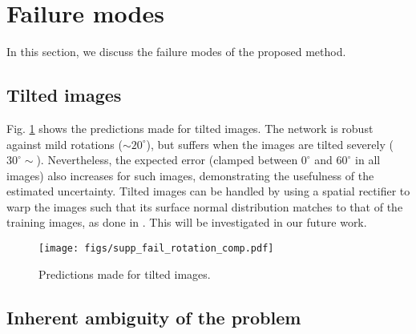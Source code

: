 \documentclass[10pt,twocolumn,letterpaper]{article}
\begin{document}


\newpage
\section{Failure modes}
\label{sec:failure}

In this section, we discuss the failure modes of the proposed method. 

\subsection{Tilted images}

Fig. \ref{fig:supp_fail_rotation} shows the predictions made for tilted images. The network is robust against mild rotations ($\sim \!\! 20^\circ$), but suffers when the images are tilted severely ($30^\circ \!\! \sim$). Nevertheless, the expected error (clamped between $0^\circ$ and $60^\circ$ in all images) also increases for such images, demonstrating the usefulness of the estimated uncertainty. Tilted images can be handled by using a spatial rectifier to warp the images such that its surface normal distribution matches to that of the training images, as done in \cite{SNfromRGB_20_TiltedSN}. This will be investigated in our future work.

\begin{figure}[h]
\begin{center}
\texttt{[image: figs/supp\_fail\_rotation\_comp.pdf]}
\end{center}
\caption{Predictions made for tilted images.}
\label{fig:supp_fail_rotation}
\end{figure}

\subsection{Inherent ambiguity of the problem}
\end{document}

